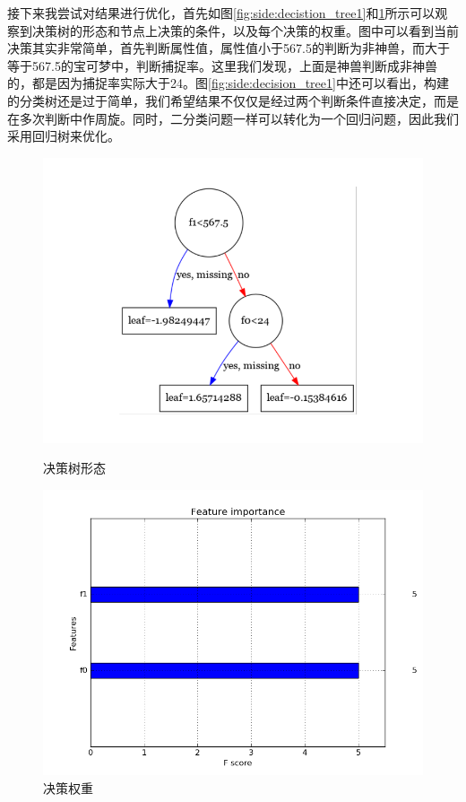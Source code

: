 \documentclass[a4paper, cs4size, oneside]{article}
\begin{document}
接下来我尝试对结果进行优化，首先如图\ref{fig:side:decistion_tree1}和\ref{fig:side:importance1}所示可以观察到决策树的形态和节点上决策的条件，以及每个决策的权重。图中可以看到当前决策其实非常简单，首先判断属性值，属性值小于567.5的判断为非神兽，而大于等于567.5的宝可梦中，判断捕捉率。这里我们发现，上面是神兽判断成非神兽的，都是因为捕捉率实际大于24。图\ref{fig:side:decision_tree1}中还可以看出，构建的分类树还是过于简单，我们希望结果不仅仅是经过两个判断条件直接决定，而是在多次判断中作周旋。同时，二分类问题一样可以转化为一个回归问题，因此我们采用回归树来优化。
\begin{figure}
\begin{minipage}[htb]{0.5\linewidth}
\centering
\includegraphics[width=0.9\linewidth]{figures/decision_tree1.png}
\caption{决策树形态}
\label{fig:side:decistion_tree1}
\end{minipage}%
\begin{minipage}[htb]{0.5\linewidth}
\centering
\includegraphics[width=0.9\linewidth]{figures/importance1.png}
\caption{决策权重}
\label{fig:side:importance1}
\end{minipage}
\end{figure}
\end{document}
